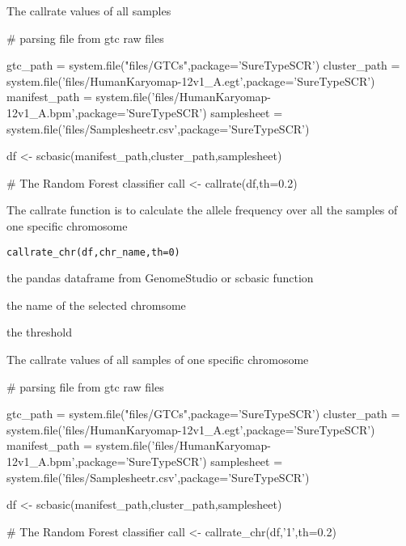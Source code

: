 \documentclass[a4paper]{book}
\begin{document}
%
\begin{Value}
The callrate values of all samples
\end{Value}
%
\begin{Examples}
\begin{ExampleCode}

# parsing file from gtc raw files

gtc_path = system.file("files/GTCs",package='SureTypeSCR')
cluster_path = system.file('files/HumanKaryomap-12v1_A.egt',package='SureTypeSCR')
manifest_path = system.file('files/HumanKaryomap-12v1_A.bpm',package='SureTypeSCR')
samplesheet = system.file('files/Samplesheetr.csv',package='SureTypeSCR')

df <- scbasic(manifest_path,cluster_path,samplesheet)

# The Random Forest classifier
call <- callrate(df,th=0.2) 




\end{ExampleCode}
\end{Examples}
%
\begin{Description}\relax
The callrate function is to calculate the allele frequency over all the samples of one specific chromosome
\end{Description}
%
\begin{Usage}
\begin{verbatim}
callrate_chr(df,chr_name,th=0)
\end{verbatim}
\end{Usage}
%
\begin{Arguments}
\begin{ldescription}
\item[\code{df}] the pandas dataframe from GenomeStudio or scbasic function
\item[\code{chr\_name}] the name of the selected chromsome
\item[\code{th}] the threshold
\end{ldescription}
\end{Arguments}
%
\begin{Value}
The callrate values of all samples of one specific chromosome
\end{Value}
%
\begin{Examples}
\begin{ExampleCode}

# parsing file from gtc raw files

gtc_path = system.file("files/GTCs",package='SureTypeSCR')
cluster_path = system.file('files/HumanKaryomap-12v1_A.egt',package='SureTypeSCR')
manifest_path = system.file('files/HumanKaryomap-12v1_A.bpm',package='SureTypeSCR')
samplesheet = system.file('files/Samplesheetr.csv',package='SureTypeSCR')

df <- scbasic(manifest_path,cluster_path,samplesheet)

# The Random Forest classifier
call <- callrate_chr(df,'1',th=0.2) 




\end{ExampleCode}
\end{Examples}
\end{document}
